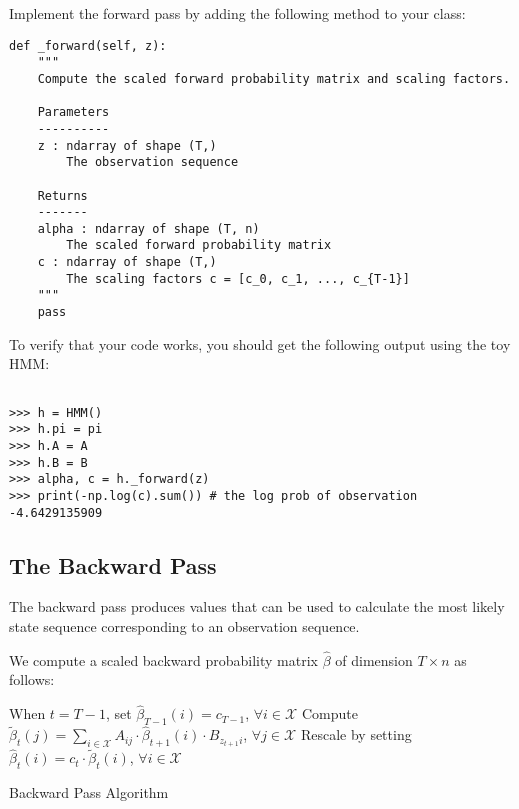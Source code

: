 \begin{problem}
Implement the forward pass by adding the following method to your class:
\begin{lstlisting}
def _forward(self, z):
    """
    Compute the scaled forward probability matrix and scaling factors.

    Parameters
    ----------
    z : ndarray of shape (T,)
        The observation sequence

    Returns
    -------
    alpha : ndarray of shape (T, n)
        The scaled forward probability matrix
    c : ndarray of shape (T,)
        The scaling factors c = [c_0, c_1, ..., c_{T-1}]
    """
    pass
\end{lstlisting}
To verify that your code works, you should get the following output using the toy HMM:
\begin{lstlisting}

>>> h = HMM()
>>> h.pi = pi
>>> h.A = A
>>> h.B = B
>>> alpha, c = h._forward(z)
>>> print(-np.log(c).sum()) # the log prob of observation
-4.6429135909
\end{lstlisting}
\end{problem}

\subsection*{The Backward Pass}
The backward pass produces values that can be used to calculate the most likely state sequence corresponding to an observation sequence.

We compute a scaled backward probability matrix $\widehat{\beta}$ of dimension $T \times n$ as follows:

\begin{algorithm}
\begin{algorithmic}[1]
    \State \textrm{When $t = T - 1$, set $\widehat{\beta}_{T - 1}(i) = c_{T-1}$, $\forall i \in \mathscr{X}$}
        \State \textrm{Compute $\tilde{\beta}_t(j) = \sum_{i \in \mathscr{X}} A_{ij}\cdot \widehat{\beta}_{t+1}(i) \cdot B_{z_{t+1}i}$, $\forall j \in \mathscr{X}$}
        \State \textrm{Rescale by setting $\widehat{\beta}_t(i) = c_t\cdot \tilde{\beta}_t(i)$, $\forall i \in \mathscr{X}$}
    \EndFor
\EndProcedure
\end{algorithmic}
\caption{Backward Pass Algorithm}
\label{alg:hmm2}
\end{algorithm}


